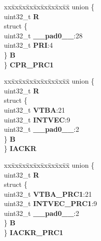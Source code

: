 \begin{DoxyCompactItemize}
\begin{tabbing}
\end{tabbing}\item 
\mbox{\label{structINTC__tag_a55b5d9f1d6d3e7218eeb176514099da2}} 
\begin{tabbing}
xx\=xx\=xx\=xx\=xx\=xx\=xx\=xx\=xx\=\kill
union \{\\
\>uint32\_t {\bfseries R}\\
\>struct \{\\
\>\>uint32\_t {\bfseries \_\_pad0\_\_}:28\\
\>\>uint32\_t {\bfseries PRI}:4\\
\>\} {\bfseries B}\\
\} {\bfseries CPR\_PRC1}\\

\end{tabbing}\item 
\mbox{\label{structINTC__tag_ab70b227e2b4a6a18e73e040738100d7c}} 
\begin{tabbing}
xx\=xx\=xx\=xx\=xx\=xx\=xx\=xx\=xx\=\kill
union \{\\
\>uint32\_t {\bfseries R}\\
\>struct \{\\
\>\>uint32\_t {\bfseries VTBA}:21\\
\>\>uint32\_t {\bfseries INTVEC}:9\\
\>\>uint32\_t {\bfseries \_\_pad0\_\_}:2\\
\>\} {\bfseries B}\\
\} {\bfseries IACKR}\\

\end{tabbing}\item 
\mbox{\label{structINTC__tag_aa8bb18802916ba3b959033a19ee55a23}} 
\begin{tabbing}
xx\=xx\=xx\=xx\=xx\=xx\=xx\=xx\=xx\=\kill
union \{\\
\>uint32\_t {\bfseries R}\\
\>struct \{\\
\>\>uint32\_t {\bfseries VTBA\_PRC1}:21\\
\>\>uint32\_t {\bfseries INTVEC\_PRC1}:9\\
\>\>uint32\_t {\bfseries \_\_pad0\_\_}:2\\
\>\} {\bfseries B}\\
\} {\bfseries IACKR\_PRC1}\\


\end{tabbing}
\end{DoxyCompactItemize}
